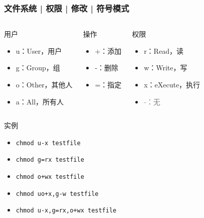 \begin{frame}[fragile]
  \frametitle{文件系统 | 权限 | 修改 | \alert{符号模式}}
  \begin{columns}
    \begin{block}{用户}
      \begin{itemize}
        \item u：User，用户
        \item g：Group，组
        \item o：Other，其他人
        \item a：All，所有人
      \end{itemize}
    \end{block}
    \pause
    \begin{block}{操作}
      \begin{itemize}
        \item +：添加
        \item -：删除
        \item =：指定
      \end{itemize}
    \end{block}
    \pause
    \begin{block}{权限}
      \begin{itemize}
        \item r：Read，读
        \item w：Write，写
        \item x：eXecute，执行
	\item \textcolor{gray}{-：无}
      \end{itemize}
    \end{block}
  \end{columns}
  \pause
  \begin{block}{实例}
    \begin{itemize}
      \item \verb|chmod u-x testfile|
      \item \verb|chmod g=rx testfile|
      \item \verb|chmod o+wx testfile|
      \item \verb|chmod uo+x,g-w testfile|
      \item \verb|chmod u-x,g=rx,o+wx testfile|
    \end{itemize}
  \end{block}
\end{frame}

